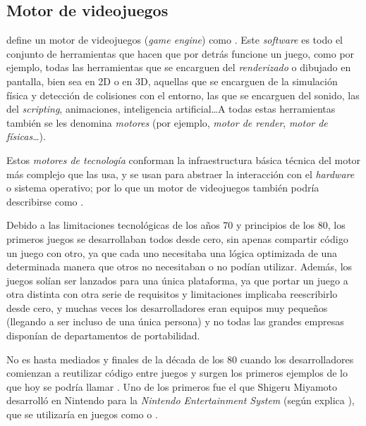 \subsection{Motor de videojuegos}
\cite{gregory2018game} define un motor de videojuegos (\textit{game engine}) como . Este \textit{software} es todo el conjunto de herramientas que hacen que por detrás funcione un juego, como por ejemplo, todas las herramientas que se encarguen del \textit{renderizado} o dibujado en pantalla, bien sea en 2D o en 3D, aquellas que se encarguen de la simulación física y detección de colisiones con el entorno, las que se encarguen del sonido, las del \textit{scripting}, animaciones, inteligencia artificial\ldots A todas estas herramientas también se les denomina \textit{motores} (por ejemplo, \textit{motor de render}, \textit{motor de físicas}\ldots).

\smallskip

Estos \textit{motores de tecnología} conforman la infraestructura básica técnica del motor más complejo que las usa, y se usan para abstraer la interacción con el \textit{hardware} o sistema operativo; por lo que un motor de videojuegos también podría describirse como .

\medskip

Debido a las limitaciones tecnológicas de los años 70 y principios de los 80, los primeros juegos se desarrollaban todos desde cero, sin apenas compartir código un juego con otro, ya que cada uno necesitaba una lógica optimizada de una determinada manera que otros no necesitaban o no podían utilizar. Además, los juegos solían ser lanzados para una única plataforma, ya que portar un juego a otra distinta con otra serie de requisitos y limitaciones implicaba reescribirlo desde cero, y muchas veces los desarrolladores eran equipos muy pequeños (llegando a ser incluso de una única persona) y no todas las grandes empresas disponían de departamentos de portabilidad.

\smallskip

No es hasta mediados y finales de la década de los 80 cuando los desarrolladores comienzan a reutilizar código entre juegos y surgen los primeros ejemplos de lo que hoy se podría llamar . Uno de los primeros fue el que Shigeru Miyamoto desarrolló en Nintendo para la \textit{Nintendo Entertainment System} (según explica \cite{williams2017history}), que se utilizaría en juegos como  o .

